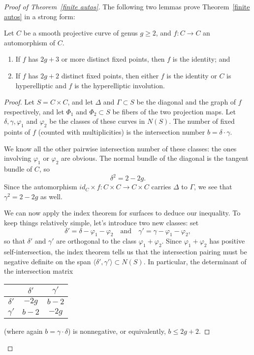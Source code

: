 \begin{proof}[Proof of Theorem~\ref{finite autos}]
 
The following two lemmas prove Theorem~\ref{finite autos} in a strong form:

\begin{lemma}Let $C$ be a smooth projective curve of genus $g \geq 2$, and $f: C \to C$ an automorphism of $C$.
\begin{enumerate}
\item If $f$ has $2g+3$ or more distinct fixed points, then $f$ is the identity; and
\item If $f$ has $2g+2$ distinct fixed points, then either $f$ is the identity or $C$ is hyperelliptic and $f$ is the hyperelliptic involution.
\end{enumerate}
\end{lemma}

\begin{proof}
Let $S = C\times C$, and let $\Delta$ and $\Gamma \subset S$ be the diagonal and the graph of $f$ respectively, and let $\Phi_1$ and $\Phi_2 \subset S$ be fibers of the two projection maps. Let $\delta, \gamma, \varphi_1$ and $\varphi_2$ be the classes of these curves in  $N(S)$. The number of fixed points of $f$ (counted with multiplicities) is the intersection number  $b = \delta \cdot \gamma$.

We know all the other pairwise intersection number of these classes: the ones involving $\varphi_1$ or $\varphi_2$ are obvious. The normal bundle of the diagonal is the tangent bundle of $C$, so
$$
\delta^2 = 2 - 2g.
$$
Since the automorphism $id_C \times f : C\times C \to C \times C$ carries $\Delta$ to $\Gamma$, we see that $\gamma^2 = 2-2g$ as well.

We can now apply the index theorem for surfaces to deduce our inequality. To keep things relatively simple, let's introduce two new classes: set
$$
\delta' = \delta - \varphi_1 - \varphi_2 \quad \text{and} \quad \gamma' = \gamma - \varphi_1 - \varphi_2,
$$
so that $\delta'$ and $\gamma'$ are orthogonal to the class $\varphi_1 + \varphi_2$. Since $\varphi_1 + \varphi_2$ has positive self-intersection, the index theorem  tells us that the intersection pairing must be negative definite on the span $\langle \delta',\gamma' \rangle \subset N(S)$. In particular, the determinant of the intersection matrix
\begin{center}
\begin{tabular}{c|c|c}
& $\delta'$ &  $\gamma'$  \\
\hline
$\delta'$ & $-2g$ & $b-2$ \\
\hline
$\gamma'$ & $b-2$ & $-2g$ 
\end{tabular}
\end{center}
(where again $b = \gamma \cdot \delta$) is nonnegative, or equivalently, $b\leq 2g+2$.
\end{proof}


\end{proof}
